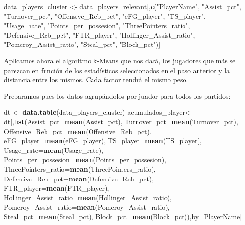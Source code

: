\documentclass[
]{article}
\newenvironment{Shaded}{\begin{snugshade}}{\end{snugshade}}
\newcommand{\DataTypeTok}[1]{\textcolor[rgb]{0.13,0.29,0.53}{#1}}
\newcommand{\KeywordTok}[1]{\textcolor[rgb]{0.13,0.29,0.53}{\textbf{#1}}}
\newcommand{\NormalTok}[1]{#1}
\newcommand{\StringTok}[1]{\textcolor[rgb]{0.31,0.60,0.02}{#1}}
\begin{document}
\begin{Shaded}
\begin{Highlighting}[]
\NormalTok{data_players_cluster <-}\StringTok{ }\NormalTok{data_players_relevant[,}\KeywordTok{c}\NormalTok{(}\StringTok{"PlayerName"}\NormalTok{, }\StringTok{"Assist_pct"}\NormalTok{, }\StringTok{"Turnover_pct"}\NormalTok{,}
                                                 \StringTok{"Offensive_Reb_pct"}\NormalTok{, }\StringTok{"eFG_player"}\NormalTok{,}
                                                 \StringTok{"TS_player"}\NormalTok{, }\StringTok{"Usage_rate"}\NormalTok{,}
                                                 \StringTok{"Points_per_possesion"}\NormalTok{,}
                                                 \StringTok{"ThreePointers_ratio"}\NormalTok{, }\StringTok{"Defensive_Reb_pct"}\NormalTok{,}
                                                 \StringTok{"FTR_player"}\NormalTok{, }\StringTok{"Hollinger_Assist_ratio"}\NormalTok{,}
                                                 \StringTok{"Pomeroy_Assist_ratio"}\NormalTok{, }\StringTok{"Steal_pct"}\NormalTok{,}
                                                 \StringTok{"Block_pct"}\NormalTok{)]}
\end{Highlighting}
\end{Shaded}

Aplicamos ahora el algoritmo k-Means que nos dará, los jugadores que más
se parezcan en función de los estadísticos seleccionados en el paso
anterior y la distancia entre los mismos. Cada factor tendrá el mismo
peso.

Preparamos pues los datos agrupándolos por juador para todos los
partidos:

\begin{Shaded}
\begin{Highlighting}[]
\NormalTok{dt <-}\StringTok{ }\KeywordTok{data.table}\NormalTok{(data_players_cluster)}
\NormalTok{acumulados_player<-dt[,}\KeywordTok{list}\NormalTok{(}\DataTypeTok{Assist_pct=}\KeywordTok{mean}\NormalTok{(Assist_pct),}
\DataTypeTok{Turnover_pct=}\KeywordTok{mean}\NormalTok{(Turnover_pct),}
\DataTypeTok{Offensive_Reb_pct=}\KeywordTok{mean}\NormalTok{(Offensive_Reb_pct),}
\DataTypeTok{eFG_player=}\KeywordTok{mean}\NormalTok{(eFG_player),}
\DataTypeTok{TS_player=}\KeywordTok{mean}\NormalTok{(TS_player),}
\DataTypeTok{Usage_rate=}\KeywordTok{mean}\NormalTok{(Usage_rate),}
\DataTypeTok{Points_per_possesion=}\KeywordTok{mean}\NormalTok{(Points_per_possesion),}
\DataTypeTok{ThreePointers_ratio=}\KeywordTok{mean}\NormalTok{(ThreePointers_ratio),}
\DataTypeTok{Defensive_Reb_pct=}\KeywordTok{mean}\NormalTok{(Defensive_Reb_pct),}
\DataTypeTok{FTR_player=}\KeywordTok{mean}\NormalTok{(FTR_player),}
\DataTypeTok{Hollinger_Assist_ratio=}\KeywordTok{mean}\NormalTok{(Hollinger_Assist_ratio),}
\DataTypeTok{Pomeroy_Assist_ratio=}\KeywordTok{mean}\NormalTok{(Pomeroy_Assist_ratio),}
\DataTypeTok{Steal_pct=}\KeywordTok{mean}\NormalTok{(Steal_pct),}
\DataTypeTok{Block_pct=}\KeywordTok{mean}\NormalTok{(Block_pct)),by=PlayerName]}
\end{Highlighting}
\end{Shaded}
\end{document}
